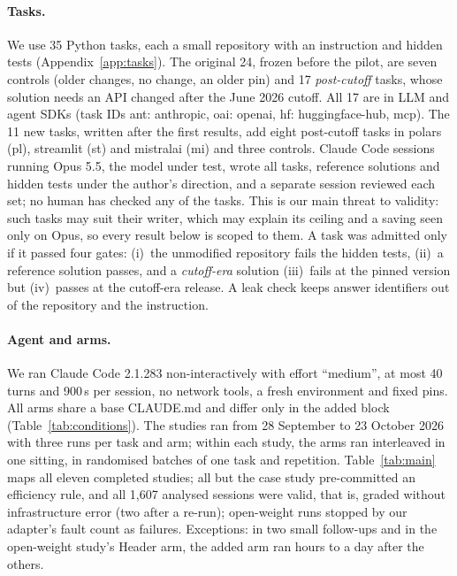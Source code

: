\documentclass[11pt]{article}
\newcommand{\aHeader}{\textsf{Header}\xspace}
\begin{document}
\paragraph{Tasks.}
We use 35 Python tasks, each a small repository with an instruction and hidden tests (Appendix~\ref{app:tasks}).
The original 24, frozen before the pilot, are seven controls (older changes, no change, an older pin) and 17 \emph{post-cutoff} tasks, whose solution needs an API changed after the June 2026 cutoff.
All 17 are in LLM and agent SDKs (task IDs ant: anthropic, oai: openai, hf: huggingface-hub, mcp).
The 11 new tasks, written after the first results, add eight post-cutoff tasks in polars (pl), streamlit (st) and mistralai (mi) and three controls.
Claude Code sessions running Opus 5.5, the model under test, wrote all tasks, reference solutions and hidden tests under the author's direction, and a separate session reviewed each set; no human has checked any of the tasks.
This is our main threat to validity: such tasks may suit their writer, which may explain its ceiling and a saving seen only on Opus, so every result below is scoped to them.
A task was admitted only if it passed four gates: (i)~the unmodified repository fails the hidden tests, (ii)~a reference solution passes, and a \emph{cutoff-era} solution (iii)~fails at the pinned version but (iv)~passes at the cutoff-era release. A leak check keeps answer identifiers out of the repository and the instruction.

\paragraph{Agent and arms.}
We ran Claude Code 2.1.283 \citep{claudecode} non-interactively with effort ``medium'', at most 40 turns and 900\,s per session, no network tools, a fresh environment and fixed pins.
All arms share a base CLAUDE.md and differ only in the added block (Table~\ref{tab:conditions}).
The studies ran from 28 September to 23 October 2026 with three runs per task and arm; within each study, the arms ran interleaved in one sitting, in randomised batches of one task and repetition.
Table~\ref{tab:main} maps all eleven completed studies; all but the case study pre-committed an efficiency rule, and all 1,607 analysed sessions were valid, that is, graded without infrastructure error (two after a re-run); open-weight runs stopped by our adapter's fault count as failures. Exceptions: in two small follow-ups and in the open-weight study's \aHeader arm, the added arm ran hours to a day after the others.
\end{document}
